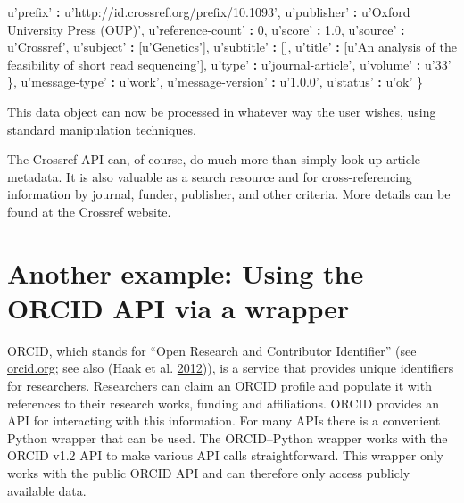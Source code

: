 \documentclass[]{krantz}
\newenvironment{Shaded}{\begin{snugshade}}{\end{snugshade}}
\newcommand{\DecValTok}[1]{\textcolor[rgb]{0.00,0.00,0.81}{#1}}
\newcommand{\FloatTok}[1]{\textcolor[rgb]{0.00,0.00,0.81}{#1}}
\newcommand{\StringTok}[1]{\textcolor[rgb]{0.31,0.60,0.02}{#1}}
\newcommand{\OperatorTok}[1]{\textcolor[rgb]{0.81,0.36,0.00}{\textbf{#1}}}
\newcommand{\NormalTok}[1]{#1}
\begin{document}
\begin{Shaded}
\begin{Highlighting}[]
\NormalTok{    u}\StringTok{'prefix'} \OperatorTok{:}\StringTok{ }\NormalTok{u}\StringTok{'http://id.crossref.org/prefix/10.1093'}\NormalTok{,}
\NormalTok{    u}\StringTok{'publisher'} \OperatorTok{:}\StringTok{ }\NormalTok{u}\StringTok{'Oxford University Press (OUP)'}\NormalTok{,}
\NormalTok{    u}\StringTok{'reference-count'} \OperatorTok{:}\StringTok{ }\DecValTok{0}\NormalTok{,}
\NormalTok{    u}\StringTok{'score'} \OperatorTok{:}\StringTok{ }\FloatTok{1.0}\NormalTok{,}
\NormalTok{    u}\StringTok{'source'} \OperatorTok{:}\StringTok{ }\NormalTok{u}\StringTok{'Crossref'}\NormalTok{,}
\NormalTok{    u}\StringTok{'subject'} \OperatorTok{:}\StringTok{ }\NormalTok{[u}\StringTok{'Genetics'}\NormalTok{],}
\NormalTok{    u}\StringTok{'subtitle'} \OperatorTok{:}\StringTok{ }\NormalTok{[],}
\NormalTok{    u}\StringTok{'title'} \OperatorTok{:}\StringTok{ }\NormalTok{[u}\StringTok{'An analysis of the feasibility of short read sequencing'}\NormalTok{],}
\NormalTok{    u}\StringTok{'type'} \OperatorTok{:}\StringTok{ }\NormalTok{u}\StringTok{'journal-article'}\NormalTok{,}
\NormalTok{    u}\StringTok{'volume'} \OperatorTok{:}\StringTok{ }\NormalTok{u}\StringTok{'33'}
\NormalTok{  \},}
\NormalTok{  u}\StringTok{'message-type'} \OperatorTok{:}\StringTok{ }\NormalTok{u}\StringTok{'work'}\NormalTok{,}
\NormalTok{  u}\StringTok{'message-version'} \OperatorTok{:}\StringTok{ }\NormalTok{u}\StringTok{'1.0.0'}\NormalTok{,}
\NormalTok{  u}\StringTok{'status'} \OperatorTok{:}\StringTok{ }\NormalTok{u}\StringTok{'ok'}
\NormalTok{\}}
\end{Highlighting}
\end{Shaded}

This data object can now be processed in whatever way the user wishes,
using standard manipulation techniques.

The Crossref API can, of course, do much more than simply look up
article metadata. It is also valuable as a search resource and for
cross-referencing information by journal, funder, publisher, and other
criteria. More details can be found at the Crossref website.

\section{Another example: Using the ORCID API via a
wrapper}\label{sec:4-4.1}

ORCID, which stands for ``Open Research and Contributor Identifier''
(see \url{orcid.org}; see also (Haak et al.
\protect\hyperlink{ref-haak2012orcid}{2012})), is a service that
provides unique identifiers for researchers. Researchers can claim an
ORCID profile and populate it with references to their research works,
funding and affiliations. ORCID provides an API for interacting with
this information. For many APIs there is a convenient Python wrapper
that can be used. The ORCID--Python wrapper works with the ORCID v1.2
API to make various API calls straightforward. This wrapper only works
with the public ORCID API and can therefore only access publicly
available data.
\end{document}
